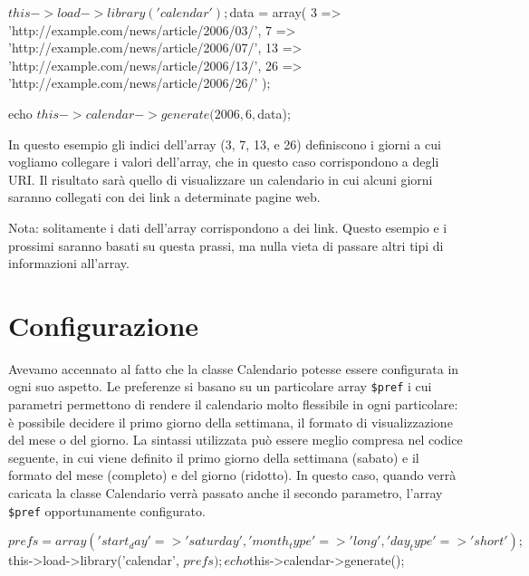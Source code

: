 \begin{code}
$this->load->library('calendar');

$data = array(
	3  => 'http://example.com/news/article/2006/03/',
  7  => 'http://example.com/news/article/2006/07/',
	13 => 'http://example.com/news/article/2006/13/',
	26 => 'http://example.com/news/article/2006/26/'
	);

echo $this->calendar->generate(2006, 6, $data);
\end{code}

In questo esempio gli indici dell'array (3, 7, 13, e 26) definiscono i giorni a cui vogliamo collegare i valori dell'array, che in questo caso corrispondono a degli \ac{URI}. Il risultato sarà quello di visualizzare un calendario in cui alcuni giorni saranno collegati con dei link a determinate pagine web.

Nota: solitamente i dati dell'array corrispondono a dei link. Questo esempio e i prossimi saranno basati su questa prassi, ma nulla vieta di passare altri tipi di informazioni all'array.

\section*{Configurazione}
Avevamo accennato al fatto che la classe Calendario potesse essere configurata in ogni suo aspetto. Le preferenze si basano su un particolare array \verb|$pref| i cui parametri permettono di rendere il calendario molto flessibile in ogni particolare: è possibile decidere il primo giorno della settimana, il formato di visualizzazione del mese o del giorno. La sintassi utilizzata può essere meglio compresa nel codice seguente, in cui viene definito il primo giorno della settimana (sabato) e il formato del mese (completo) e del giorno (ridotto). In questo caso, quando verrà caricata la classe Calendario verrà passato anche il secondo parametro, l'array \verb|$pref| opportunamente configurato.

\begin{code}
$prefs = array (
	'start_day'    => 'saturday',
	'month_type'   => 'long',
	'day_type'     => 'short'
             );

$this->load->library('calendar', $prefs);

echo $this->calendar->generate();
\end{code}

